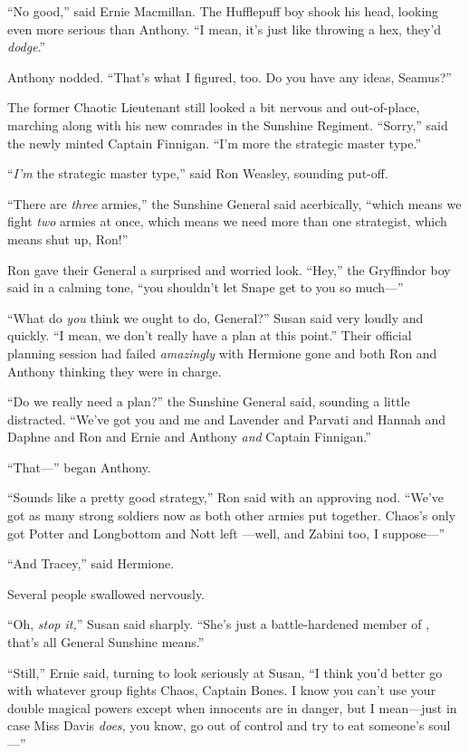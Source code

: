 “No good,” said Ernie Macmillan. The Hufflepuff boy shook his
head, looking even more serious than Anthony. “I mean, it’s just
like throwing a hex, they’d \emph{dodge}.”

Anthony nodded. “That’s what I figured, too. Do you have any
ideas, Seamus?”

The former Chaotic Lieutenant still looked a bit nervous and
out-of-place, marching along with his new comrades in the Sunshine
Regiment. “Sorry,” said the newly minted Captain Finnigan. “I’m
more the strategic master type.”

“\emph{I’m} the strategic master type,” said Ron Weasley,
sounding put-off.

“There are \emph{three} armies,” the Sunshine General said
acerbically, “which means we fight \emph{two} armies at once, which
means we need more than one strategist, which means shut up,
Ron!”

Ron gave their General a surprised and worried look. “Hey,” the
Gryffindor boy said in a calming tone, “you shouldn’t let Snape get
to you so much—”

“What do \emph{you} think we ought to do, General?” Susan said
very loudly and quickly. “I mean, we don’t really have a plan at
this point.” Their official planning session had failed
\emph{amazingly} with Hermione gone and both Ron and Anthony
thinking they were in charge.

“Do we really need a plan?” the Sunshine General said, sounding
a little distracted. “We’ve got you and me and Lavender and Parvati
and Hannah and Daphne and Ron and Ernie and Anthony \emph{and}
Captain Finnigan.”

“That—” began Anthony.

“Sounds like a pretty good strategy,” Ron said with an approving
nod. “We’ve got as many strong soldiers now as both other armies
put together. Chaos’s only got Potter and Longbottom and Nott left
—well, and Zabini too, I suppose—”

“And Tracey,” said Hermione.

Several people swallowed nervously.

“Oh, \emph{stop it,}” Susan said sharply. “She’s just a
battle-hardened member of \SPHEW, that’s all General Sunshine
means.”

“Still,” Ernie said, turning to look seriously at Susan, “I
think you’d better go with whatever group fights Chaos, Captain
Bones. I know you can’t use your double magical powers except when
innocents are in danger, but I mean—just in case Miss Davis
\emph{does,} you know, go out of control and try to eat someone’s
soul—”

